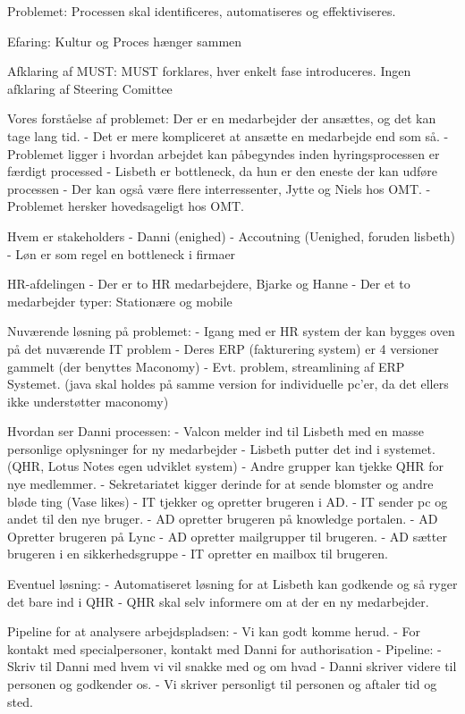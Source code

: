 Problemet: Processen skal identificeres, automatiseres og effektiviseres.

Efaring: Kultur og Proces hænger sammen

Afklaring af MUST:
MUST forklares, hver enkelt fase introduceres.
Ingen afklaring af Steering Comittee


Vores forståelse af problemet:
Der er en medarbejder der ansættes, og det kan tage lang tid.
	- Det er mere kompliceret at ansætte en medarbejde end som så.
	- Problemet ligger i hvordan arbejdet kan påbegyndes inden hyringsprocessen er færdigt processed
	- Lisbeth er bottleneck, da hun er den eneste der kan udføre processen
	- Der kan også være flere interressenter, Jytte og Niels hos OMT.
	- Problemet hersker hovedsageligt hos OMT.

Hvem er stakeholders
	- Danni (enighed)
	- Accoutning (Uenighed, foruden lisbeth)
	- Løn er som regel en bottleneck i firmaer

HR-afdelingen
	- Der er to HR medarbejdere, Bjarke og Hanne
	- Der et to medarbejder typer: Stationære og mobile

Nuværende løsning på problemet:
	- Igang med er HR system der kan bygges oven på det nuværende IT problem
	- Deres ERP (fakturering system) er 4 versioner gammelt (der benyttes Maconomy)
	- Evt. problem, streamlining af ERP Systemet. (java skal holdes på samme version for individuelle pc'er, da det ellers ikke understøtter maconomy)

Hvordan ser Danni processen:
	- Valcon melder ind til Lisbeth med en masse personlige oplysninger for ny medarbejder
	- Lisbeth putter det ind i systemet. (QHR, Lotus Notes egen udviklet system)
	- Andre grupper kan tjekke QHR for nye medlemmer.
		- Sekretariatet kigger derinde for at sende blomster og andre bløde ting (Vase likes)
		- IT tjekker og opretter brugeren i AD.
		- IT sender pc og andet til den nye bruger.
	- AD opretter brugeren på knowledge portalen.
	- AD Opretter brugeren på Lync
	- AD opretter mailgrupper til brugeren.
	- AD sætter brugeren i en sikkerhedsgruppe
	- IT opretter en mailbox til brugeren.

Eventuel løsning:
	- Automatiseret løsning for at Lisbeth kan godkende og så ryger det bare ind i QHR
	- QHR skal selv informere om at der en ny medarbejder.


Pipeline for at analysere arbejdspladsen:
	- Vi kan godt komme herud.
	- For kontakt med specialpersoner, kontakt med Danni for authorisation
	- Pipeline:
		- Skriv til Danni med hvem vi vil snakke med og om hvad
		- Danni skriver videre til personen og godkender os.
		- Vi skriver personligt til personen og aftaler tid og sted.

